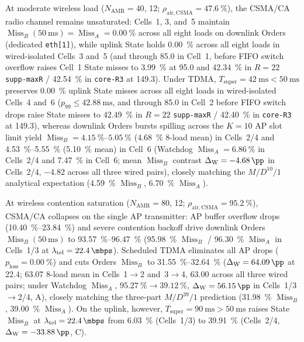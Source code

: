 \documentclass[11pt,a4paper]{article}
\newcommand{\Namr}{\ensuremath{N_{\mathrm{AMR}}}}
\newcommand{\ltel}{\ensuremath{\lambda_{\mathrm{tel}}}}
\newcommand{\Tsuper}{\ensuremath{T_{\mathrm{super}}}}
\newcommand{\MissA}{\ensuremath{\operatorname{Miss}_A}}
\newcommand{\MissB}{\ensuremath{\operatorname{Miss}_B}}
\newcommand{\ploss}{\ensuremath{p_{\mathrm{loss}}}}
\newcommand{\GainW}{\ensuremath{\Delta_{\mathrm{W}}}}
\begin{document}
At moderate wireless load ($\Namr=40$, \qty{12}{\mbps}; $\rho_{\mathrm{air,CSMA}} = \qty{47.6}{\percent}$), the CSMA/CA radio channel remains unsaturated: Cells~1, 3, and~5 maintain $\MissB(\qty{50}{\milli\second}) = \MissA = \qty{0.00}{\percent}$ across all eight loads on downlink Orders (dedicated \texttt{eth[1]}), while uplink State holds \qty{0.00}{\percent} across all eight loads in wired-isolated Cells~3 and~5 (and through \qty{85.0}{\mbps} in Cell~1, before FIFO switch overflow raises Cell~1 State misses to \qty{3.99}{\percent} at \qty{95.0}{\mbps} and \qty{42.34}{\percent} in $R=22$ \texttt{supp-maxR} / \qty{42.54}{\percent} in \texttt{core-R3} at \qty{149.3}{\mbps}). Under TDMA, $\Tsuper = \qty{42}{\milli\second} < \qty{50}{\milli\second}$ preserves \qty{0.00}{\percent} uplink State misses across all eight loads in wired-isolated Cells~4 and~6 ($p_{99} \le \qty{42.88}{\milli\second}$, and through \qty{85.0}{\mbps} in Cell~2 before FIFO switch drops raise State misses to \qty{42.49}{\percent} in $R=22$ \texttt{supp-maxR} / \qty{42.40}{\percent} in \texttt{core-R3} at \qty{149.3}{\mbps}), whereas downlink Orders bursts spilling across the $K=10$ AP slot limit yield $\MissB = \qtyrange{4.15}{5.05}{\percent}$ (\qty{4.68}{\percent} 8-load mean) in Cells~2/4 and \qtyrange{4.53}{5.55}{\percent} (\qty{5.10}{\percent} mean) in Cell~6 (Watchdog $\MissA = \qty{6.86}{\percent}$ in Cells~2/4 and \qty{7.47}{\percent} in Cell~6; mean $\MissB$ contrast $\GainW = \qty{-4.68}{\pp}$ in Cells~2/4, \qty{-4.82}{\pp} across all three wired pairs), closely matching the $M/D^{10}/1$ analytical expectation (\qty{4.59}{\percent} $\MissB$, \qty{6.70}{\percent} $\MissA$).

At wireless contention saturation ($\Namr=80$, \qty{12}{\mbps}; $\rho_{\mathrm{air,CSMA}} = \qty{95.2}{\percent}$), CSMA/CA collapses on the single AP transmitter: AP buffer overflow drops (\qtyrange{10.40}{23.84}{\percent}) and severe contention backoff drive downlink Orders $\MissB(\qty{50}{\milli\second})$ to \qtyrange{93.57}{96.47}{\percent} (\qty{95.98}{\percent} $\MissB$ / \qty{96.30}{\percent} $\MissA$ in Cells~1/3 at $\ltel=\qty{22.4}{\mbps}$). Scheduled TDMA eliminates all AP drops ($\ploss = \qty{0.00}{\percent}$) and cuts Orders $\MissB$ to \qtyrange{31.55}{32.64}{\percent} ($\GainW = \qty{+64.09}{\pp}$ at \qty{22.4}{\mbps}; \qty{+63.07}{\pp} 8-load mean in Cells~1$\to$2 and~3$\to$4, \qty{+63.00}{\pp} across all three wired pairs; under Watchdog $\MissA$, $\qty{95.27}{\percent} \to \qty{39.12}{\percent}$, $\GainW = \qty{+56.15}{\pp}$ in Cells~1/3$\to$2/4, A), closely matching the three-part $M/D^{39}/1$ prediction (\qty{31.98}{\percent} $\MissB$, \qty{39.00}{\percent} $\MissA$). On the uplink, however, $\Tsuper = \qty{90}{\milli\second} > \qty{50}{\milli\second}$ raises State $\MissB$ at $\ltel=\qty{22.4}{\mbps}$ from \qty{6.03}{\percent} (Cells~1/3) to \qty{39.91}{\percent} (Cells~2/4, $\GainW = \qty{-33.88}{\pp}$, C).
\end{document}
